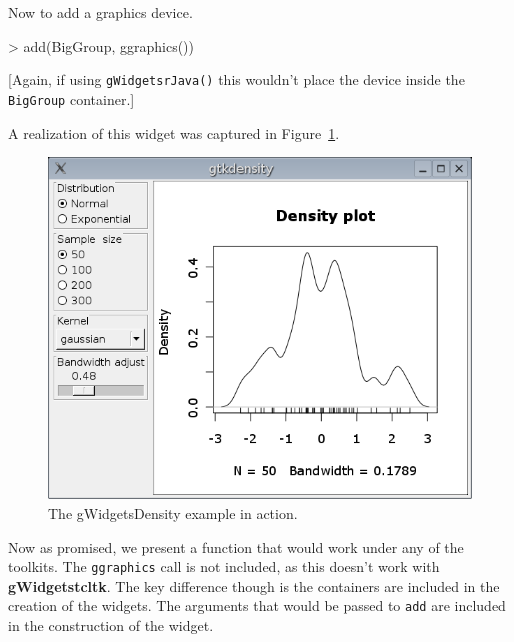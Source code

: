 \documentclass[12pt]{article}
\newcommand{\RCode}[1]{\texttt{#1}}
\newcommand{\RFunc}[1]{\texttt{#1()}}
\newcommand{\RPackage}[1]{\textbf{#1}}
\begin{document}
Now to add a graphics device.
\begin{Soutput}
> add(BigGroup, ggraphics())
\end{Soutput}
[Again, if using \RFunc{gWidgetsrJava} this wouldn't place the device
inside the \RCode{BigGroup} container.]

A realization of this widget was captured in Figure~\ref{fig:gtkdensity}.

\begin{figure}
  \centering
  \includegraphics[width=.6\textwidth]{gtkdensity}
  \caption{The gWidgetsDensity example in action.}
  \label{fig:gtkdensity}
\end{figure}


Now as promised, we present a function that would work under any of
the toolkits. The \RCode{ggraphics} call is not included, as this
doesn't work with \RPackage{gWidgetstcltk}. The key difference though
is the containers are included in the creation of the widgets. The
arguments that would be passed to \RCode{add} are included in the
construction of the widget.
\end{document}
